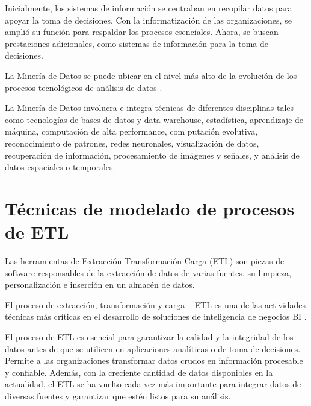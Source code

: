 \vspace{1\baselineskip}
Inicialmente, los sistemas de información se centraban en recopilar datos para apoyar la toma de decisiones. Con la informatización de las organizaciones, se amplió su función para respaldar los procesos esenciales. Ahora, se buscan
prestaciones adicionales, como sistemas de información para la toma de decisiones.

\vspace{1\baselineskip}
La Minería de Datos se puede ubicar en el nivel más alto de la evolución de los procesos tecnológicos de análisis de datos \cite{martinez2001mineria}.

\vspace{1\baselineskip}
La Minería de Datos involucra e integra técnicas de diferentes disciplinas tales como tecnologías de bases de datos y data warehouse, estadística, aprendizaje de máquina, computación de alta performance, com  putación evolutiva, reconocimiento de patrones, redes neuronales, visualización de datos, recuperación de información, procesamiento de imágenes y señales, y análisis de datos espaciales o temporales\cite{schab2018mineria}.

\section{Técnicas de modelado de procesos de ETL}

Las herramientas de Extracción-Transformación-Carga (ETL) son piezas de
software responsables de la extracción de datos de varias fuentes, su limpieza,
personalización e inserción en un almacén de datos\cite{SIMITSIS200822}.

\vspace{1\baselineskip}
El proceso de extracción, transformación y carga – ETL es una de las actividades técnicas más críticas en el desarrollo de soluciones de inteligencia de negocios BI \cite{martinez2013tecnicas}.

\vspace{1\baselineskip}
El proceso de ETL es esencial para garantizar la calidad y la integridad de los datos antes de que se utilicen en aplicaciones analíticas o de toma de decisiones. Permite a las organizaciones transformar datos crudos en información procesable y confiable. Además, con la creciente cantidad de datos disponibles en la actualidad, el ETL se ha vuelto cada vez más importante para integrar datos de diversas fuentes y garantizar que estén listos para su análisis.

